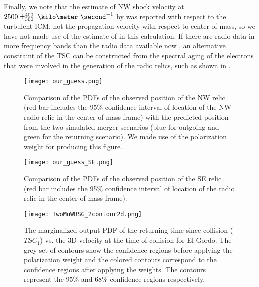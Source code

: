 \par 
Finally, we note that the estimate of NW shock velocity at $2500
\pm^{400}_{300}~\kilo\meter~\second^{-1}$ by \cite{L13} was reported with respect to
the turbulent ICM, not the propagation velocity with respect to center of
mass, so we have not made use of the estimate of \cite{L13} in this
calculation. If there are radio data in more frequency bands than
the radio data available now \citep{L13}, an alternative constraint of the
TSC can be constructed from the spectral aging of the electrons that were involved in the generation of the
radio relics, such as shown in \citet{Stroe14}. \par
\begin{figure}
	\texttt{[image: our\_guess.png]}
	\caption{Comparison of the PDFs of the observed position of the NW relic (red bar
		includes the 95\% confidence interval of location of the NW radio relic in the center of mass frame) with the predicted position from the two simulated merger
		scenarios (blue for outgoing and green for the returning scenario).
	We made use of the polarization weight for producing this figure.} 
	\label{fig:our_guessed_scenario}
\end{figure}
\begin{figure}
	\texttt{[image: our\_guess\_SE.png]}
	\caption{Comparison of the PDFs of the observed position of the SE relic (red bar
	includes the 95\% confidence interval of location of the radio relic in
the center of mass frame).}
\end{figure}
\begin{figure}
	\texttt{[image: TwoMnWBSG\_2contour2d.png]}
	\caption{The marginalized output PDF of the returning time-since-collision
($TSC_1$) vs. the 3D velocity at the time of collision for El Gordo. The
grey set of contours show the confidence regions before applying the
polarization weight and the colored contours correspond to the confidence
regions after applying the weights. The contours represent the 95\% and
68\% confidence regions respectively. }
	\label{fig:TSC_v3D}
\end{figure}
